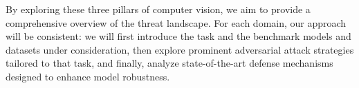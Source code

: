 \documentclass[../main.tex]{subfiles}
\begin{document}
By exploring these three pillars of computer vision, we aim to provide a comprehensive overview of the threat landscape. For each domain, our approach will be consistent: we will first introduce the task and the benchmark models and datasets under consideration, then explore prominent adversarial attack strategies tailored to that task, and finally, analyze state-of-the-art defense mechanisms designed to enhance model robustness.
\end{document}
